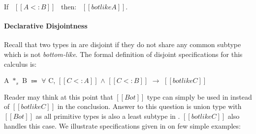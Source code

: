 \begin{lemma}
  If \ $[[A <: B]]$ \ then: \ $[[botlike A]]$.
\label{lemma:union:bl-completeness}
\end{lemma}

\begin{comment}
\begin{proof}
  By induction on type $[[A]]$.
  \begin{itemize}
    \item Cases $[[Top]]$, $[[Bot]]$, $[[Int]]$ and $[[A -> B]]$ are trivial to prove.
    \item Case $[[A \/ B]]$ requires \Cref{lemma:union:sub-or}.
  \end{itemize}
\end{proof}
\end{comment}

\paragraph{Declarative Disjointness}
Recall that two types in \cal are disjoint if they do not share any common subtype which is not 
\emph{bottom-like}. The formal definition of disjoint specifications for this calculus is:

\begin{definition}
  A $*_s$ B $\Coloneqq$ $\forall$ C, $[[C <: A]]$ $\wedge$ $[[C <: B]]$ $\rightarrow$ $[[botlike C]]$
\label{def:union:disj}
\end{definition}

\noindent Reader may think at this point that $[[Bot]]$ type can simply be used in 
instead of $[[botlike C]]$ in the conclusion. Answer to this question is 
union type with $[[Bot]]$ as all primitive types is also a least subtype in \cal. 
$[[botlike C]]$ also handles this case.
We illustrate specifications given in  on few simple examples:

